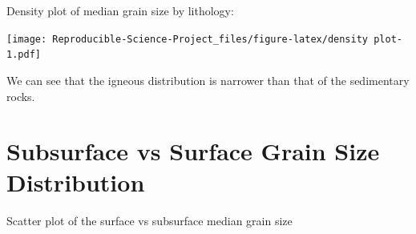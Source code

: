 \documentclass[
]{book}
\newenvironment{Shaded}{\begin{snugshade}}{\end{snugshade}}
\newcommand{\DataTypeTok}[1]{\textcolor[rgb]{0.13,0.29,0.53}{#1}}
\newcommand{\DecValTok}[1]{\textcolor[rgb]{0.00,0.00,0.81}{#1}}
\newcommand{\KeywordTok}[1]{\textcolor[rgb]{0.13,0.29,0.53}{\textbf{#1}}}
\newcommand{\NormalTok}[1]{#1}
\newcommand{\OperatorTok}[1]{\textcolor[rgb]{0.81,0.36,0.00}{\textbf{#1}}}
\newcommand{\StringTok}[1]{\textcolor[rgb]{0.31,0.60,0.02}{#1}}
\begin{document}
Density plot of median grain size by lithology:

\begin{Shaded}
\end{Shaded}

\texttt{[image: Reproducible-Science-Project\_files/figure-latex/density plot-1.pdf]}

We can see that the igneous distribution is narrower than that of the sedimentary rocks.

\hypertarget{subsurface-vs-surface-grain-size-distribution}{%
\chapter{Subsurface vs Surface Grain Size Distribution}\label{subsurface-vs-surface-grain-size-distribution}}

Scatter plot of the surface vs subsurface median grain size
\end{document}
